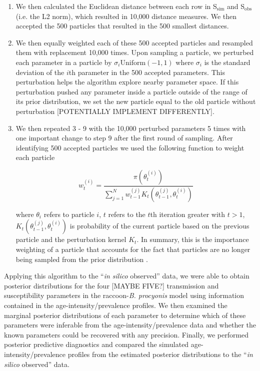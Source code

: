 \documentclass[11pt]{article}
\begin{document}
\begin{enumerate}
\item
  We then calculated the Euclidean distance between each row in S$_\text{sim}$
  and S$_\text{obs}$ (i.e. the L2 norm), which resulted in 10,000 distance
  measures. We then accepted the 500 particles that resulted in the
  500 smallest distances.
\item
  We then equally weighted each of these 500 accepted particles and
  resampled them with replacement 10,000 times. Upon sampling a
  particle, we perturbed each parameter in a particle by
 $\sigma_i \text{Uniform}(-1, 1)$ where $\sigma_i$ is the standard
  deviation of the $i$th parameter in the 500 accepted parameters. This
  perturbation helps the algorithm explore nearby parameter space. If this perturbation pushed any parameter inside a particle outside of the range of its prior distribution, we set the new particle equal to the old particle without perturbation [POTENTIALLY IMPLEMENT DIFFERENTLY].
\item
  We then repeated 3 - 9 with the 10,000 perturbed parameters 5
  times with one important change to step 9 after the first round of
  sampling. After identifying 500 accepted particles we used the
  following function to weight each particle \citep{Toni2009}

  \begin{equation}
    w_t^{(i)} = \dfrac{\pi(\theta_t^{(i)})}{\sum_{j = 1}^N w_{t - 1}^{(j)} K_t(\theta_{t - 1}^{(j)}, \theta_t^{(i)})}
  \end{equation}

  where $\theta_i$ refers to particle $i$, $t$ refers to the $t$th iteration greater with $t > 1$,  $K_t(\theta_{t - 1}^{(j)}, \theta_t^{(i)})$ is probability of the current particle based on the previous particle and the perturbation kernel $K_t$. 
  In summary, this is the
  importance weighting of a particle that accounts for the fact that
  particles are no longer being sampled from the prior distribution \citep{Beaumont2010}.
\end{enumerate}

Applying this algorithm to the ``\emph{in silico} observed'' data, we were able to obtain posterior distributions for the four [MAYBE FIVE?]
transmission and susceptibility parameters in the raccoon-\emph{B.
procyonis} model using information contained in the age-intensity/prevalence
profiles.  We then examined the marginal posterior distributions of each parameter to determine which of these parameters were inferable from the age-intensity/prevalence data and whether the known parameters could be recovered with any precision. Finally, we performed posterior predictive diagnostics and compared the simulated age-intensity/prevalence profiles from the estimated posterior distributions to the ``\emph{in silico} observed'' data.
\end{document}
